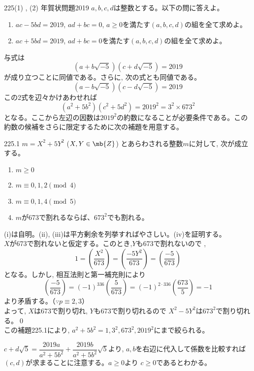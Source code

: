 \begin{thm}{225}{(1) , (2) }{年賀状問題2019}
 $a, b, c, d$は整数とする。以下の問に答えよ。
 \begin{enumerate}
  \item $ac-5bd=2019$, $ad+bc=0$, $a\ge 0$を満たす$(a, b, c, d)$の組を全て求めよ。
  \item $ac+5bd=2019$, $ad+bc=0$を満たす$(a, b, c, d)$の組を全て求めよ。
 \end{enumerate}
\end{thm}

与式は
\[(a+b\sqrt{-5})(c+d\sqrt{-5})=2019\]
が成り立つことに同値である。さらに, 次の式とも同値である。
\[(a-b\sqrt{-5})(c-d\sqrt{-5})=2019\]
この2式を辺々かけあわせれば
\[(a^2+5b^2)(c^2+5d^2)=2019^2=3^2\times 673^2\]
となる。ここから左辺の因数は$2019^2$の約数になることが必要条件である。この約数の候補をさらに限定するために次の補題を用意する。 
\begin{subthm}{225.1}
 $m=X^2+5Y^2$ ($X,Y\in \mb{Z}$) とあらわされる整数$m$に対して, 次が成立する。\\
 \begin{enumerate}[label=\roman*,align=CenterWithParen]
  \item $m\geq 0$
  \item $m\equiv 0, 1, 2 \pmod{4}$
  \item $m\equiv 0, 1, 4 \pmod{5}$
  \item $m$が673で割れるならば、$673^2$でも割れる。
 \end{enumerate}
\end{subthm}
(i)は自明。(ii), (iii)は平方剰余を列挙すればやさしい。(iv)を証明する。\\
$X$が673で割れないと仮定する。このとき,$Y$も673で割れないので
,\[1=\left(\dfrac{X^2}{673}\right)=\left(\dfrac{-5Y^2}{673}\right)=\left(\dfrac{-5}{673}\right)\]
となる。しかし, 相互法則と第一補充則により
\[ \left(\dfrac{-5}{673}\right)=(-1)^{336}\left(\dfrac{5}{673}\right)=(-1)^{2\cdot 336}\left(\dfrac{673}{5}\right)=-1 \]
より矛盾する。（$\because p\equiv 2,3$）\\
よって, $X$は673で割り切れ, $Y$も673で割り切れるので $X^2-5Y^2$は$673^2$で割り切れる。\qed\\
この補題225.1により, $a^2+5b^2=1,3^2,673^2,2019^2$にまで絞られる。

$c+d\sqrt{5}=\dfrac{2019a}{a^2+5b^2}+\dfrac{2019b}{a^2+5b^2}\sqrt{5}$より, $a,b$を右辺に代入して係数を比較すれば$(c,d)$が求まることに注意する。$a\geq 0$より $c\geq 0$であるとわかる。


